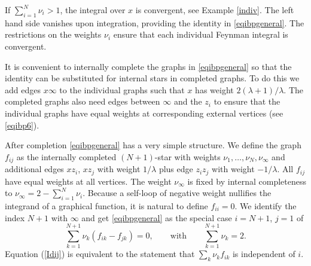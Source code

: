 \documentclass[oneside]{amsart}
\theoremstyle{plain}
\begin{document}
If $\sum_{i=1}^N\nu_i>1$, the integral over $x$ is convergent, see Example \ref{indiv}. The left hand side vanishes upon integration, providing the identity in \eqref{eqibpgeneral}.
The restrictions on the weights $\nu_i$ ensure that each individual Feynman integral is convergent.

It is convenient to internally complete the graphs in \eqref{eqibpgeneral} so that the identity can be substituted for internal stars in completed graphs.
To do this we add edges $x\infty$ to the individual graphs such that $x$ has weight $2(\lambda+1)/\lambda$. The completed graphs also need edges between
$\infty$ and the $z_i$ to ensure that the individual graphs have equal weights at corresponding external vertices (see \eqref{eqibp6}).

After completion \eqref{eqibpgeneral} has a very simple structure. We define the graph $f_{ij}$ as the internally completed $(N+1)$-star with weights
$\nu_1,\ldots,\nu_N,\nu_\infty$ and additional edges $xz_i$, $xz_j$ with weight $1/\lambda$ plus edge $z_iz_j$ with weight $-1/\lambda$. All $f_{ij}$ have equal weights at
all vertices. The weight $\nu_\infty$ is fixed by internal completeness to $\nu_\infty=2-\sum_{i=1}^N\nu_i$. Because a self-loop of negative weight nullifies the integrand of a graphical function,
it is natural to define $f_{ii}=0$. We identify the index $N+1$ with $\infty$ and get \eqref{eqibpgeneral} as the special case $i=N+1$, $j=1$ of
\begin{equation}\label{Idij}
\sum_{k=1}^{N+1}\nu_k(f_{ik}-f_{jk})=0,\qquad\text{with}\qquad\sum_{k=1}^{N+1}\nu_k=2.
\end{equation}
Equation (\ref{Idij}) is equivalent to the statement that $\sum_k\nu_kf_{ik}$ is independent of $i$.
\end{document}
